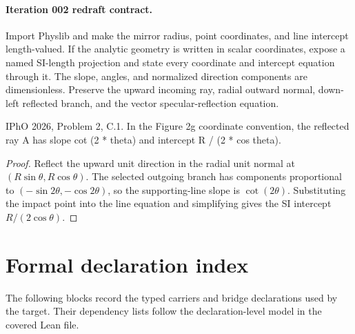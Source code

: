\paragraph{Iteration 002 redraft contract.}
Import Physlib and make the mirror radius, point coordinates, and line
intercept length-valued.  If the analytic geometry is written in scalar
coordinates, expose a named SI-length projection and state every coordinate
and intercept equation through it.  The slope, angles, and normalized
direction components are dimensionless.  Preserve the upward incoming ray,
radial outward normal, down-left reflected branch, and the vector
specular-reflection equation.

\begin{theorem}
  \label{thm:physics:IPhO_2026_2_C_1:target}
  IPhO 2026, Problem 2, C.1. In the Figure 2g coordinate convention, the reflected ray A has slope cot (2 * theta) and intercept R / (2 * cos theta).
\end{theorem}
\begin{proof}
  Reflect the upward unit direction in the radial unit normal at
  \((R\sin\theta,R\cos\theta)\).  The selected outgoing branch has components
  proportional to \((-\sin 2\theta,-\cos 2\theta)\), so the supporting-line
  slope is \(\cot(2\theta)\).  Substituting the impact point into the line
  equation and simplifying gives the SI intercept \(R/(2\cos\theta)\).
\end{proof}
\section*{Formal declaration index}
The following blocks record the typed carriers and bridge declarations used by the target.  Their dependency lists follow the declaration-level model in the covered Lean file.

